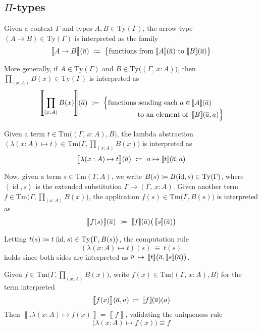 \documentclass{article}
\theoremstyle{definition}
\renewcommand{\int}[1]
    {\left\llbracket #1 \right\rrbracket}       %
\newcommand{\Pii}[2]{\prod_{#1} #2}             %
\newcommand{\lam}[2]{\lambda #1 \mapsto #2}
\newcommand{\substType}[2]{#2#1}%
\newcommand{\substTerm}[2]{#2#1}%
\newcommand{\extsub}[2]{\ang{#1,#2}}
\newcommand{\Ty}{\mathrm{Ty}}
\newcommand{\Tm}{\mathrm{Tm}}
\DeclareMathOperator{\id}{id}				    %
\newcommand{\defeq}{
	\mathrel{\mathrel{\mathop:}\mkern-1.2mu=}}	%
\newcommand{\tup}[1]{\overline{#1}}
\newcommand{\ang}[1]{\left\langle #1 \right\rangle}
\newcommand{\n}{\hspace{-0.2em}}                %
\begin{document}
\subsection{\texorpdfstring{$\Pi$}{Pi}-types}

Given a context $\Gamma$ and types $A, B \in \Ty(\Gamma)$, the arrow type $(A \to B) \in \Ty(\Gamma)$ is interpreted as the family
$$\int{\big.A \to B}\n(\tup{a})\ \defeq\ \big\{ \text{functions from}\, \int{A}\n(\tup{a}) \text{ to}\, \int{B}\n(\tup{a}) \big\} $$

More generally, if $A \in \Ty(\Gamma)$ and $B \in \Ty \big( (\Gamma,\, x:A) \big)$, then $\Pii{(x:A)}{B(x)}\in \Ty(\Gamma)$ is interpreted as
\begin{align*}
    \int{\Pii{(x:A)}{B(x)}}\hspace{-0.35em}(\tup{a})\ \defeq\ \Big\{ \text{functions sending each } a \in &\int{A}\n(\tup{a}) \\[-5mm]
    \text{ to an element of } &\int{B}\n(\tup{a},a) \Big\}
\end{align*}

Given a term $t \in \Tm \big( (\Gamma,\, x:A), B \big)$, the lambda abstraction $(\lam{(x:A)}{t}) \in \Tm\big( \Gamma, \Pii{(x:A)}{B(x)} \big)$ is interpreted as
$$\int{\big.\lam{(x:A)}{t}}\n(\tup{a})\ \defeq\ a %
\mapsto \int{t}\n(\tup{a},a)$$

Now, given a term $s \in \Tm(\Gamma, A)$, we write $B(s) \defeq \substType{(\id,s)}{B} \in \Ty(\Gamma)$, where $\extsub{\id}{s}$ is the extended substitution $\Gamma \to (\Gamma,\, x:A)$. Given another term $f \in \Tm\big( \Gamma, \Pii{(x:A)}{B(x)} \big)$, the application $f(s) \in \Tm\big(\Gamma,B(s) \big)$ is interpreted as
$$\int{\big.f(s)
}\n(\tup{a})\ \defeq\ \int{f}\n(\tup{a}) \big( \int{s}\n(\tup{a}) \big)$$

Letting $t(s) \defeq \substTerm{\extsub{\id}{s}}{t} \in \Ty\big(\Gamma,B(s)\big)$, the computation rule $$(\lam{(x:A)}{t})(s)\ \equiv\ t(s)$$ holds since both sides are interpreted as $\tup{a}\, \mapsto\, \int{t}\n\big(\tup{a}, \int{s}\n(\tup{a}) \big)$.

Given $f \in \Tm\big( \Gamma, \Pii{(x:A)}{B(x)} \big)$, write $f(x) \in \Tm \big( (\Gamma,\, x:A), B \big)$ for the term interpreted $$\int{\big.f(x)}\n(\tup{a},a)\, \defeq\, \int{f}\n(\tup{a})(a)$$
Then $\int{\big.\lam{(x:A)}{f(x)}} = \int{f}$, validating the uniqueness rule $$\big( \lam{(x:A)}{f(x)} \big) \equiv f$$
\end{document}
